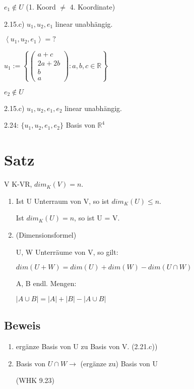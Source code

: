 \documentclass[a4paper, openany]{book}
\begin{document}
    \par \medskip

    $e_1 \not \in U$ (1. Koord $\neq$ 4. Koordinate)

    2.15.c) $u_1, u_2, e_1 $ linear unabhängig.


    $\left \langle u_1, u_2, e_1 \right \rangle = ?$

    \par \medskip

    $u_1 := \left \lbrace \begin{pmatrix}a+c \\ 2a+2b \\ b \\ a \end{pmatrix} : a,b,c \in \mathbb{R} \right \rbrace$

    \par \medskip

    $e_2 \not \in U$

    2.15.c) $u_1, u_2, e_1, e_2$ linear unabhängig.

    2.24: $\{u_1, u_2,e_1, e_2\}$ Basis von $\mathbb{R}^4$

    \section{Satz}

    V K-VR, $dim_K(V) = n$.

    \begin{enumerate}[label=(\alph*)]
      \item Ist U Unterraum von V, so ist $dim_K(U) \le n$.

      Ist $dim_K(U) = n$, so ist U = V.

      \item (Dimensionsformel)

      U, W Unterräume von V, so gilt:

      $dim(U+W) = dim(U) + dim(W) - dim(U \cap W)$

      A, B endl. Mengen:

      $| A \cup B| = |A| + |B| - |A \cup B|$
    \end{enumerate}

    \subsection{Beweis}

    \begin{enumerate}[label=(\alph*)]
      \item ergänze Basis von U zu Basis von V. (2.21.c))

      \item Basis von $U \cap W \rightarrow$ (ergänze zu) Basis von U

      (WHK 9.23)
    \end{enumerate}
\end{document}

